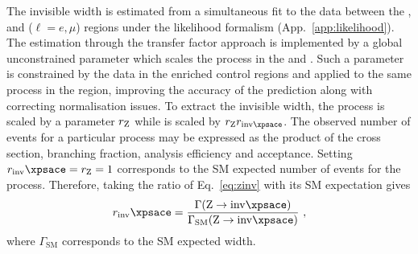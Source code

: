 The \PZ invisible width is estimated from a simultaneous fit to the data
between the \metplusjets, \diellplusjets and \ellplusjets ($\ell=e,\mu$)
regions under the likelihood formalism (App.~\ref{app:likelihood}). The \IWj
estimation through the transfer factor approach is implemented by a global
unconstrained parameter which scales the \IWj process in the \metplusjets and
\ellplusjets. Such a parameter is constrained by the data in the \IWj enriched
control regions and applied to the same process in the \metplusjets region,
improving the accuracy of the prediction along with correcting normalisation
issues. To extract the invisible width, the \IZllj process is scaled by a
parameter $r_\mathrm{Z}$ while \IZvvj is scaled by $r_\PZ r_{\inv}$. The observed
number of events for a particular process may be expressed as the product of
the cross section, branching fraction, analysis efficiency and acceptance.
Setting $r_\inv=r_\PZ=1$ corresponds to the SM expected number of events for
the process. Therefore, taking the ratio of Eq.~\ref{eq:zinv} with its SM
expectation gives
%
\begin{equation}
    r_\inv = \frac{\Gamma(\PZ\ra\inv)}{\Gamma_{\mathrm{SM}}(\PZ\ra\inv)}\ ,
\end{equation}
%
where $\Gamma_{\mathrm{SM}}$ corresponds to the SM expected width.


